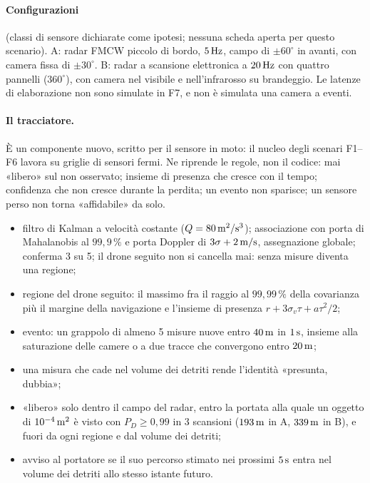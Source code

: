 \paragraph{Configurazioni} (classi di sensore dichiarate come ipotesi; nessuna scheda aperta per questo scenario). A: radar FMCW piccolo di bordo, $5\,\mathrm{Hz}$, campo di $\pm60^\circ$ in avanti, con camera fissa di $\pm30^\circ$. B: radar a scansione elettronica a $20\,\mathrm{Hz}$ con quattro pannelli ($360^\circ$), con camera nel visibile e nell'infrarosso su brandeggio. Le latenze di elaborazione non sono simulate in F7, e non è simulata una camera a eventi.

\paragraph{Il tracciatore.} È un componente nuovo, scritto per il sensore in moto: il nucleo degli scenari F1--F6 lavora su griglie di sensori fermi. Ne riprende le regole, non il codice: mai «libero» sul non osservato; insieme di presenza che cresce con il tempo; confidenza che non cresce durante la perdita; un evento non sparisce; un sensore perso non torna «affidabile» da solo.
\begin{itemize}
\item filtro di Kalman a velocità costante ($Q=80\,\mathrm{m^2/s^3}$); associazione con porta di Mahalanobis al $99{,}9\,\%$ e porta Doppler di $3\sigma+2\,\mathrm{m/s}$, assegnazione globale; conferma 3 su 5; il drone seguito non si cancella mai: senza misure diventa una regione;
\item regione del drone seguito: il massimo fra il raggio al $99{,}99\,\%$ della covarianza più il margine della navigazione e l'insieme di presenza $r+3\sigma_v\tau+a\tau^2/2$;
\item evento: un grappolo di almeno 5 misure nuove entro $40\,\mathrm{m}$ in $1\,\mathrm{s}$, insieme alla saturazione delle camere o a due tracce che convergono entro $20\,\mathrm{m}$;
\item una misura che cade nel volume dei detriti rende l'identità «presunta, dubbia»;
\item «libero» solo dentro il campo del radar, entro la portata alla quale un oggetto di $10^{-4}\,\mathrm{m^2}$ è visto con $P_D\ge0{,}99$ in 3 scansioni ($193\,\mathrm{m}$ in A, $339\,\mathrm{m}$ in B), e fuori da ogni regione e dal volume dei detriti;
\item avviso al portatore se il suo percorso stimato nei prossimi $5\,\mathrm{s}$ entra nel volume dei detriti allo stesso istante futuro.
\end{itemize}

